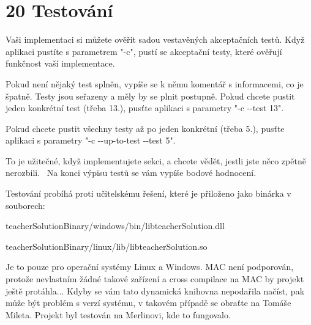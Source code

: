 \chapter{20 Testování}
\hypertarget{p20_testovani}{}\label{p20_testovani}
Vaši implementaci si můžete ověřit sadou vestavěných akceptačních testů. Když aplikaci pustíte s parametrem "{}-\/c"{}, pustí se akceptační testy, které ověřují funkčnost vaší implementace. 
\begin{DoxyCode}{0}

\end{DoxyCode}
 Pokud není nějaký test splněn, vypíše se k němu komentář s informacemi, co je špatně. Testy jsou seřazeny a měly by se plnit postupně. Pokud chcete pustit jeden konkrétní test (třeba 13.), pusťte aplikaci s parametry "{}-\/c -\/-\/test 13"{}. 
\begin{DoxyCode}{0}

\end{DoxyCode}
 Pokud chcete pustit všechny testy až po jeden konkrétní (třeba 5.), pusťte aplikaci s parametry "{}-\/c -\/-\/up-\/to-\/test -\/-\/test 5"{}. 
\begin{DoxyCode}{0}

\end{DoxyCode}
 To je užitečné, když implementujete sekci, a chcete vědět, jestli jste něco zpětně nerozbili.~\newline
 Na konci výpisu testů se vám vypíše bodové hodnocení.

Testování probíhá proti učitelskému řešení, které je přiloženo jako binárka v souborech\+:
\begin{DoxyItemize}
\item teacher\+Solution\+Binary/windows/bin/libteacher\+Solution.\+dll
\item teacher\+Solution\+Binary/linux/lib/libteacher\+Solution.\+so
\end{DoxyItemize}

Je to pouze pro operační systémy Linux a Windows. MAC není podporován, protože nevlastním žádné takové zařízení a cross compilace na MAC by projekt ještě protáhla... Kdyby se vám tato dynamická knihovna nepodařila načíst, pak může být problém s verzí systému, v takovém případě se obraťte na Tomáše Mileta. Projekt byl testován na Merlinovi, kde to fungovalo. 